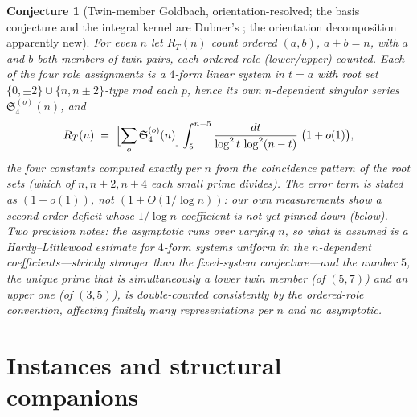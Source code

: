 \documentclass[11pt]{article}
\newtheorem{conjecture}{Conjecture}
\theoremstyle{definition}
\newcommand{\SG}{\mathfrak S}
\begin{document}
\setcounter{conjecture}{16}%
\begin{conjecture}[Twin-member Goldbach, orientation-resolved; the
basis conjecture and the integral kernel are Dubner's
\cite{Dubner2000}; the orientation decomposition apparently
new]\label{c17}
For even $n$ let $R_T(n)$ count ordered $(a,b)$, $a+b=n$, with $a$
and $b$ both members of twin pairs, each ordered role (lower/upper)
counted.  Each of the four role assignments is a $4$-form linear
system in $t=a$ with root set
$\{0,\pm2\}\cup\{n,n\pm2\}$-type mod each $p$, hence its own
$n$-dependent singular series $\SG_4^{(o)}(n)$, and
\[
R_T(n)\;=\;\Bigl[\sum_{o}\SG_4^{(o)}(n)\Bigr]
\int_5^{n-5}\frac{dt}{\log^2t\,\log^2(n-t)}\;\bigl(1+o(1)\bigr),
\]
the four constants computed exactly per $n$ from the coincidence
pattern of the root sets (which of $n,n\pm2,n\pm4$ each small prime
divides).  The error term is stated as $(1+o(1))$, not
$(1+O(1/\log n))$: our own measurements show a second-order deficit
whose $1/\log n$ coefficient is not yet pinned down (below).  Two precision
notes: the
asymptotic runs over \emph{varying} $n$, so what is assumed is a
Hardy--Littlewood estimate for $4$-form systems \emph{uniform in the
$n$-dependent coefficients}---strictly stronger than the fixed-system
conjecture---and the number $5$, the unique prime that is
simultaneously a lower twin member (of $(5,7)$) and an upper one (of
$(3,5)$), is double-counted consistently by the ordered-role
convention, affecting finitely many representations per $n$ and no
asymptotic.
\end{conjecture}

\section{Instances and structural companions}
\end{document}
